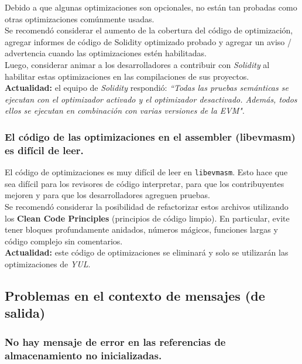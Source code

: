 Debido a que algunas optimizaciones son opcionales, no están tan probadas como otras optimizaciones comúnmente usadas.\\

Se recomendó considerar el aumento de la cobertura del código de optimización, agregar informes de código de Solidity optimizado probado y agregar un aviso / advertencia cuando las optimizaciones estén habilitadas.\\

Luego, considerar animar a los desarrolladores a contribuir con \textit{Solidity} al habilitar estas optimizaciones en las compilaciones de sus proyectos.\\

\textbf{Actualidad:} el equipo de \textit{Solidity} respondió: \textit{``Todas las pruebas semánticas se ejecutan con el optimizador activado y el optimizador desactivado. Además, todos ellos se ejecutan en combinación con varias versiones de la EVM"}.\\

\subsubsection{El código de las optimizaciones en el assembler (libevmasm) es difícil de leer.}

El código de optimizaciones\cite{GHlibevmasmCSE} es muy difícil de leer en \texttt{libevmasm}. Esto hace que sea difícil para los revisores de código interpretar, para que los contribuyentes mejoren y para que los desarrolladores agreguen pruebas.\\

Se recomendó considerar la posibilidad de refactorizar estos archivos utilizando los \textbf{Clean Code Principles}\cite{MediumMindorksCleanCode} (principios de código limpio). En particular, evite tener bloques profundamente anidados, números mágicos, funciones largas y código complejo sin comentarios.\\

\textbf{Actualidad:} este código de optimizaciones se eliminará y solo se utilizarán las optimizaciones de \textit{YUL}.\\

\subsection{Problemas en el contexto de mensajes (de salida)}

\subsubsection{No hay mensaje de error en las referencias de almacenamiento no inicializadas.}

